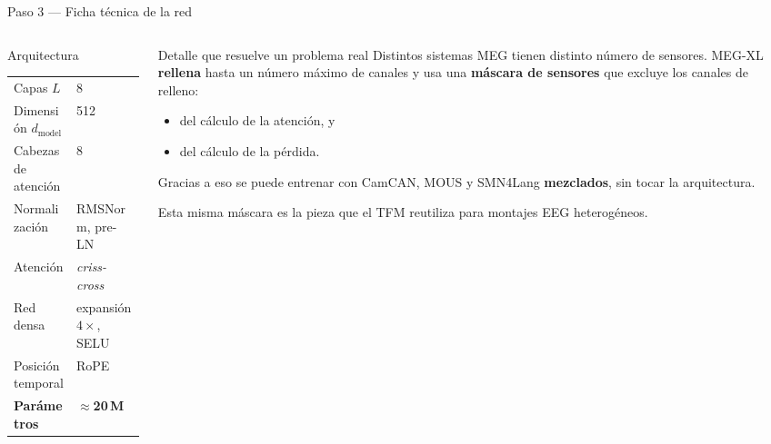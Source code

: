 \documentclass[aspectratio=169,10pt]{beamer}
\newcommand{\term}[1]{\textbf{\color{deepgreen}#1}}
\begin{document}
\begin{frame}[c]{Paso 3 --- Ficha técnica de la red}
  \small
  \begin{columns}[t,totalwidth=\linewidth]
    \begin{column}{0.5\linewidth}
      \begin{block}{Arquitectura}
        \footnotesize
        \begin{tabular}{@{}ll@{}}
          \toprule
          Capas $L$ & 8 \\
          Dimensión $d_{\text{model}}$ & 512 \\
          Cabezas de atención & 8 \\
          Normalización & RMSNorm, pre-LN \\
          Atención & \emph{criss-cross} \\
          Red densa & expansión $4\times$, SELU \\
          Posición temporal & RoPE \\
          \textbf{Parámetros} & \textbf{$\approx$20\,M} \\
          \bottomrule
        \end{tabular}
      \end{block}
    \end{column}
    \begin{column}{0.48\linewidth}
      \begin{block}{Detalle que resuelve un problema real}
        Distintos sistemas MEG tienen distinto número de sensores. MEG-XL \term{rellena} hasta un número máximo de canales y usa una \term{máscara de sensores} que excluye los canales de relleno:
        \begin{itemize}\footnotesize
          \item del cálculo de la atención, y
          \item del cálculo de la pérdida.
        \end{itemize}
        \vspace{1mm}
        Gracias a eso se puede entrenar con CamCAN, MOUS y SMN4Lang \term{mezclados}, sin tocar la arquitectura.
      \end{block}
      {\footnotesize\color{muted} Esta misma máscara es la pieza que el TFM reutiliza para montajes EEG heterogéneos.}
    \end{column}
  \end{columns}
\end{frame}
\end{document}

